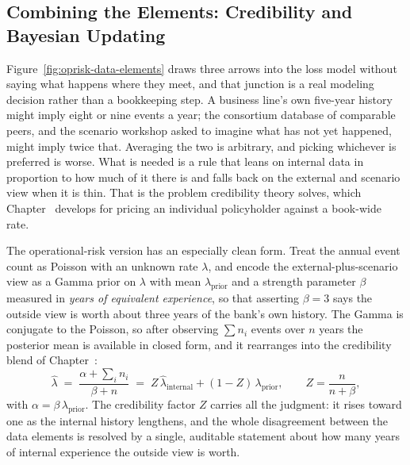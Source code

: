 \documentclass[../ai_in_finance]{subfiles}
\begin{document}
\subsection{Combining the Elements: Credibility and Bayesian Updating}
\label{sec:oprisk-credibility}

Figure~\ref{fig:oprisk-data-elements} draws three arrows into the loss model without saying what happens where they meet, and that junction is a real modeling decision rather than a bookkeeping step. A business line's own five-year history might imply eight or nine events a year; the consortium database of comparable peers, and the scenario workshop asked to imagine what has not yet happened, might imply twice that. Averaging the two is arbitrary, and picking whichever is preferred is worse. What is needed is a rule that leans on internal data in proportion to how much of it there is and falls back on the external and scenario view when it is thin. That is the problem credibility theory solves, which Chapter~ develops for pricing an individual policyholder against a book-wide rate.

The operational-risk version has an especially clean form. Treat the annual event count as Poisson with an unknown rate $\lambda$, and encode the external-plus-scenario view as a Gamma prior on $\lambda$ with mean $\lambda_{\text{prior}}$ and a strength parameter $\beta$ measured in \emph{years of equivalent experience}, so that asserting $\beta=3$ says the outside view is worth about three years of the bank's own history. The Gamma is conjugate to the Poisson, so after observing $\sum n_i$ events over $n$ years the posterior mean is available in closed form, and it rearranges into the credibility blend of Chapter~:
\begin{equation}
\hat\lambda \;=\; \frac{\alpha + \sum_i n_i}{\beta + n} \;=\; Z\,\hat\lambda_{\text{internal}} + (1-Z)\,\lambda_{\text{prior}}, \qquad Z = \frac{n}{n+\beta},
\label{eq:oprisk-credibility}
\end{equation}
with $\alpha = \beta\,\lambda_{\text{prior}}$. The credibility factor $Z$ carries all the judgment: it rises toward one as the internal history lengthens, and the whole disagreement between the data elements is resolved by a single, auditable statement about how many years of internal experience the outside view is worth.
\end{document}
